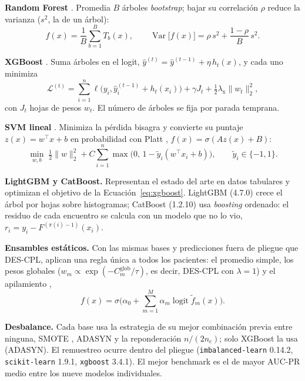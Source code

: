 \documentclass[pdflatex,sn-mathphys-num]{sn-jnl}
\theoremstyle{plain}
\begin{document}
\textbf{Random Forest} \cite{bib_breiman_rf}. Promedia $B$ árboles \emph{bootstrap}; bajar su correlación $\rho$ reduce la varianza ($s^2$, la de un árbol):
\begin{equation}
f(x)=\frac{1}{B}\sum_{b=1}^{B}T_b(x), \qquad \operatorname{Var}\big[f(x)\big]=\rho\,s^2+\frac{1-\rho}{B}\,s^2.
\label{eq:rf}
\end{equation}

\textbf{XGBoost} \cite{bib_chen}. Suma árboles en el logit, $\hat y^{(t)}=\hat y^{(t-1)}+\eta\, h_t(x)$, y cada uno minimiza
\begin{equation}
\mathcal{L}^{(t)}=\sum_{i=1}^{n}\ell\big(y_i,\hat{y}_i^{(t-1)}+h_t(x_i)\big)+\gamma J_t+\tfrac{1}{2}\lambda_{\text{x}}\lVert w_t\rVert_2^2,
\label{eq:xgboost}
\end{equation}
con $J_t$ hojas de pesos $w_t$. El número de árboles se fija por parada temprana.

\textbf{SVM lineal} \cite{bib_cortes}. Minimiza la pérdida bisagra y convierte su puntaje $z(x)=w^\top x+b$ en probabilidad con Platt \cite{bib_platt}, $f(x)=\sigma(Az(x)+B)$:
\begin{equation}
\min_{w,b}\;\tfrac{1}{2}\lVert w\rVert_2^2+C\sum_{i=1}^{n}\max\big(0,\,1-\tilde{y}_i(w^\top x_i+b)\big), \qquad \tilde y_i\in\{-1,1\}.
\label{eq:svm}
\end{equation}

\textbf{LightGBM y CatBoost.} Representan el estado del arte en datos tabulares y optimizan el objetivo de la Ecuación~\eqref{eq:xgboost}. LightGBM \cite{bib_ke_2017} (4.7.0) crece el árbol por hojas sobre histogramas; CatBoost \cite{bib_prokhorenkova_2018} (1.2.10) usa \emph{boosting} ordenado: el residuo de cada encuentro se calcula con un modelo que no lo vio, $r_i=y_i-F^{(\pi(i)-1)}(x_i)$.

\textbf{Ensambles estáticos.} Con las mismas bases y predicciones fuera de pliegue que DES-CPL, aplican una regla única a todos los pacientes: el promedio simple, los pesos globales ($w_m\propto\exp(-C^{\text{glob}}_m/\tau)$, es decir, DES-CPL con $\lambda=1$) y el apilamiento \cite{bib_wolpert_1992},
\begin{equation}
f(x)=\sigma\Big(\alpha_0+\sum_{m=1}^{M} \alpha_m\operatorname{logit}\tilde f_m(x)\Big).
\label{eq:apilamiento}
\end{equation}

\textbf{Desbalance.} Cada base usa la estrategia de su mejor combinación previa entre ninguna, SMOTE \cite{bib_smote}, ADASYN \cite{bib_adasyn} y la reponderación $n/(2n_c)$; solo XGBoost la usa (ADASYN). El remuestreo ocurre dentro del pliegue (\texttt{imbalanced-learn} 0.14.2, \texttt{scikit-learn} 1.9.1, \texttt{xgboost} 3.4.1). El mejor benchmark es el de mayor AUC-PR medio entre los nueve modelos individuales.
\end{document}
